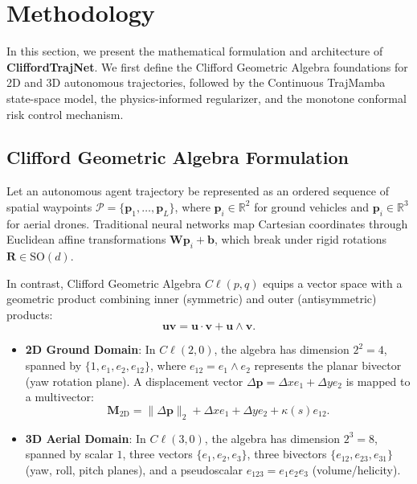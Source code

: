 \section{Methodology}
\label{sec:method}

In this section, we present the mathematical formulation and architecture of \textbf{CliffordTrajNet}.
We first define the Clifford Geometric Algebra foundations for 2D and 3D autonomous trajectories, followed by the Continuous TrajMamba state-space model, the physics-informed regularizer, and the monotone conformal risk control mechanism.

\subsection{Clifford Geometric Algebra Formulation}

Let an autonomous agent trajectory be represented as an ordered sequence of spatial waypoints $\mathcal{P} = \{\mathbf{p}_1, \dots, \mathbf{p}_L\}$, where $\mathbf{p}_i \in \mathbb{R}^2$ for ground vehicles and $\mathbf{p}_i \in \mathbb{R}^3$ for aerial drones.
Traditional neural networks map Cartesian coordinates through Euclidean affine transformations $\mathbf{W}\mathbf{p}_i + \mathbf{b}$, which break under rigid rotations $\mathbf{R} \in \mathrm{SO}(d)$.

In contrast, Clifford Geometric Algebra $C\ell(p, q)$ equips a vector space with a geometric product combining inner (symmetric) and outer (antisymmetric) products:
\begin{equation}
\mathbf{u} \mathbf{v} = \mathbf{u} \cdot \mathbf{v} + \mathbf{u} \wedge \mathbf{v}.
\end{equation}
\begin{itemize}
    \item \textbf{2D Ground Domain}: In $C\ell(2,0)$, the algebra has dimension $2^2 = 4$, spanned by $\{1, e_1, e_2, e_{12}\}$, where $e_{12} = e_1 \wedge e_2$ represents the planar bivector (yaw rotation plane). A displacement vector $\Delta \mathbf{p} = \Delta x e_1 + \Delta y e_2$ is mapped to a multivector:
    \begin{equation}
    \mathbf{M}_{\mathrm{2D}} = \|\Delta\mathbf{p}\|_2 + \Delta x e_1 + \Delta y e_2 + \kappa(s) e_{12}.
    \end{equation}
    \item \textbf{3D Aerial Domain}: In $C\ell(3,0)$, the algebra has dimension $2^3 = 8$, spanned by scalar $1$, three vectors $\{e_1, e_2, e_3\}$, three bivectors $\{e_{12}, e_{23}, e_{31}\}$ (yaw, roll, pitch planes), and a pseudoscalar $e_{123} = e_1 e_2 e_3$ (volume/helicity).
\end{itemize}

